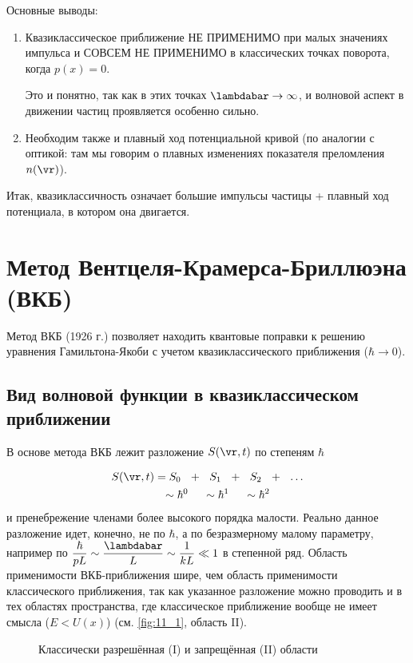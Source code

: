 Основные выводы:

\begin{enumerate}
\item Квазиклассическое приближение НЕ ПРИМЕНИМО при малых значениях импульса и СОВСЕМ НЕ ПРИМЕНИМО в классических точках поворота, когда $p(x)=0$. 

Это и понятно, так как в этих точках $\lambdabar \to \infty$, и волновой аспект в движении частиц проявляется особенно сильно.
\item Необходим также и плавный ход потенциальной кривой (по аналогии с оптикой: там мы говорим о плавных изменениях показателя преломления $n(\vr)$).
\end{enumerate}

Итак, квазиклассичность означает большие импульсы частицы + плавный ход потенциала, в котором она двигается. 

\section{Метод Вентцеля-Крамерса-Бриллюэна (ВКБ)}

Метод ВКБ (1926 г.) позволяет находить квантовые поправки к решению уравнения Гамильтона-Якоби с учетом квазиклассического приближения ($\hbar \to 0$).
 
\subsection{Вид волновой функции в квазиклассическом приближении}

В основе метода ВКБ лежит разложение $S(\vr,t)$ по степеням $\hbar$

\begin{eqnarray*}
S(\vr,t)=S_0 ~~+~~ S_1 ~~+~~ S_2 ~~+~~ \dots&\\
\sim \hbar^0~~~~\sim \hbar^1 ~~~~ \sim \hbar^2~~~~~~~~~&
\end{eqnarray*}
и пренебрежение членами более высокого порядка малости. Реально данное разложение идет, конечно, не по $\hbar$, а по безразмерному малому параметру, например по $\dfrac{\hbar}{pL} \sim \dfrac{\lambdabar}{L} \sim \dfrac{1}{kL} \ll 1$ в степенной ряд. Область применимости ВКБ-приближения шире, чем область применимости классического приближения, так как указанное разложение можно проводить и в тех областях пространства, где классическое приближение вообще не имеет смысла ($E < U(x)$) (см. \autoref{fig:11_1}, область II).

\begin{figure}
\centering
{}
\caption{Классически разрешённая (I) и запрещённая (II) области} \label{fig:11_1}
\end{figure}

